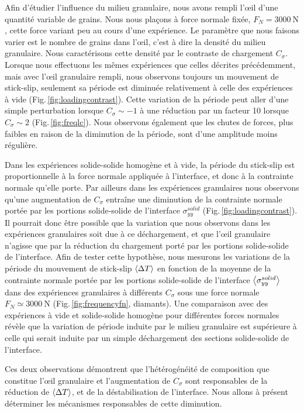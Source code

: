 Afin d'étudier l'influence du milieu granulaire, nous avons rempli l'œil d'une quantité variable de grains. Nous nous plaçons à force normale fixée, $F_N=\SI{3000}{\newton}$, cette force variant peu au cours d'une expérience. Le paramètre que nous faisons varier est le nombre de grains dans l'œil, c'est à dire la densité du milieu granulaire. Nous caractérisons cette densité par le contraste de chargement $C_\sigma$. Lorsque nous effectuons les mêmes expériences que celles décrites précédemment, mais avec l'œil granulaire rempli, nous observons toujours un mouvement de stick-slip, seulement sa période est diminuée relativement à celle des expériences à vide (Fig.\,\ref{fig:loadingcontrast}). Cette variation de la période peut aller d'une simple perturbation lorsque $C_\sigma\sim-1$ à une réduction par un facteur 10 lorsque $C_\sigma\sim 2$ (Fig.\,\ref{fig:freqlc}). Nous observons également que les chutes de forces, plus faibles en raison de la diminution de la période, sont d'une amplitude moins régulière.



Dans les expériences solide-solide homogène et à vide, la période du stick-slip est proportionnelle à la force normale appliquée à l'interface, et donc à la contrainte normale qu'elle porte. Par ailleurs dans les expériences granulaires nous observons qu'une augmentation de $C_\sigma$ entraîne une diminution de la contrainte normale portée par les portions solide-solide de l'interface $\sigma_{yy}^{solid}$ (Fig.\,\ref{fig:loadingcontrast}). Il pourrait donc être possible que la variation que nous observons dans les expériences granulaires soit due à ce déchargement, et que l'œil granulaire n'agisse que par la réduction du chargement porté par les portions solide-solide de l'interface. Afin de tester cette hypothèse, nous mesurons les variations de la période du mouvement de stick-slip $\left\langle {\Delta T} \right\rangle$ en fonction de la moyenne de la contrainte normale portée par les portions solide-solide de l'interface $\left\langle {\sigma_{yy}^{solid}} \right\rangle$ dans des expériences granulaires à différents $C_\sigma$ sous une force normale $F_N\simeq \SI{3000}{\newton}$ (Fig.\,\ref{fig:frequencyfn}, diamants). Une comparaison avec des expériences à vide et solide-solide homogène pour différentes forces normales révèle que la variation de période induite par le milieu granulaire est supérieure à celle qui serait induite par un simple déchargement des sections solide-solide de l'interface.

Ces deux observations démontrent que l'hétérogénéité de composition que constitue l'œil granulaire et l'augmentation de $C_\sigma$ sont responsables de la réduction de $\left\langle {\Delta T} \right\rangle$, et de la déstabilisation de l'interface. Nous allons à présent déterminer les mécanismes responsables de cette diminution.


